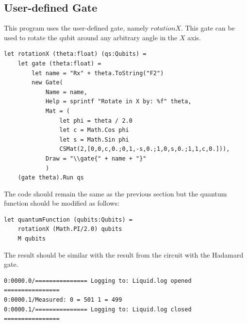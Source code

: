 \documentclass[12pt]{third-rep}
\begin{document}
\subsection{User-defined Gate}
This program uses the user-defined gate, namely $rotationX$. This gate can be used to rotate the qubit around any arbitrary angle in the $X$ axis.
\begin{verbatim}
let rotationX (theta:float) (qs:Qubits) =
    let gate (theta:float) =
        let name = "Rx" + theta.ToString("F2")
        new Gate(
            Name = name,
            Help = sprintf "Rotate in X by: %f" theta,
            Mat = (
                let phi = theta / 2.0
                let c = Math.Cos phi
                let s = Math.Sin phi
                CSMat(2,[0,0,c,0.;0,1,-s,0.;1,0,s,0.;1,1,c,0.])),
            Draw = "\\gate{" + name + "}"
            )
    (gate theta).Run qs
\end{verbatim}
The code should remain the same as the previous section but the quantum function should be modified as follows:
\begin{verbatim}
let quantumFunction (qubits:Qubits) =
    rotationX (Math.PI/2.0) qubits
    M qubits
\end{verbatim}
The result should be similar with the result from the circuit with the Hadamard gate.
\begin{verbatim}
0:0000.0/=============== Logging to: Liquid.log opened ================
0:0000.1/Measured: 0 = 501 1 = 499
0:0000.1/=============== Logging to: Liquid.log closed ================
\end{verbatim}
\end{document}
